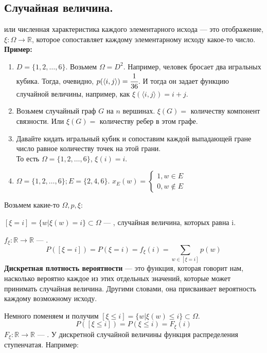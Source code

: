\subsection{Случайная величина.}
 или численная характеристика каждого элементарного исхода --- это отображение, $\xi: \Omega \rightarrow \mathbb{R}$, которое сопоставляет каждому элементарному исходу какое-то число.\\
\textbf{Пример:}

\begin{enumerate}
    \item $D = \{1,2,\ldots,6\}$. Возьмем $\Omega = D^2$. Например, человек бросает два игральных кубика. Тогда, очевидно, $p(\langle i,j\rangle) = \cfrac{1}{36}$. И тогда он задает функцию случайной величины, например, как $\xi(\langle i,j \rangle) = i+j$.

    \item Возьмем случайный граф $G$ на $n$ вершинах. $\xi(G) = $ количеству компонент связности. Или  $\xi(G) = $ количеству ребер в этом графе.

    \item Давайте кидать игральный кубик и сопоставим каждой выпадающей гране число равное количеству точек на этой грани.\\То есть $\Omega = \{1,2,\ldots,6\}$, $\xi (i) = i$. 
    \item  $\Omega =\{1,2,\ldots,6\}; E = \{2,4,6\}$. $x_E(w) = \begin{cases}
        1, w\in E\\
        0, w\notin E 
    \end{cases}$
\end{enumerate}

Возьмем какие-то $\Omega, p, \xi$:

$\left[\xi = i\right] = \{w|\xi(w)=i\}\subset \Omega$ --- , случайная величина, которых равна i. 

 $f_{\xi}:\mathbb{R}\rightarrow \mathbb{R}$ --- .
$$P([\xi=i])=P(\xi=i) = f_{\xi}(i) =\sum\limits_{w \in [\xi=i]}p(w)$$
\textbf{Дискретная плотность вероятности} --- это функция, которая говорит нам, насколько вероятно каждое из этих отдельных значений, которые может принимать случайная величина. Другими словами, она присваивает вероятность каждому возможному исходу.

Немного поменяем и получим $\left[\xi \leq i\right] = \{w|\xi(w)\leq i\}\subset \Omega$.
$$P([\xi \leq i])=P(\xi\leq i) = F_{\xi}(i)$$
 $F_{\xi}:\mathbb{R}\rightarrow \mathbb{R}$ --- . У дискретной случайной величины функция распределения ступенчатая. Например:

